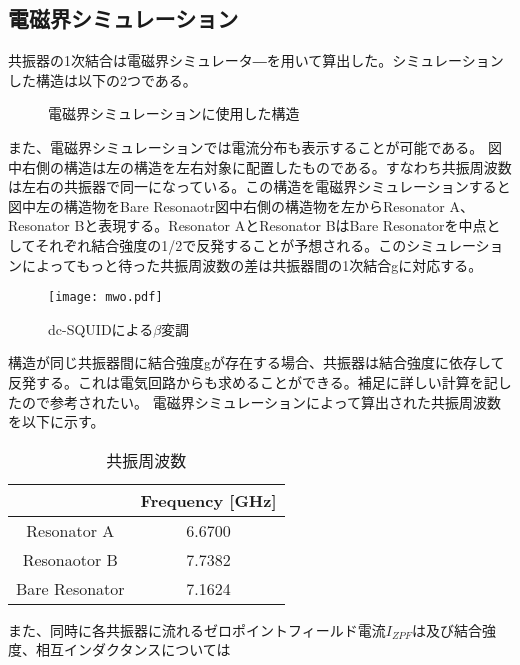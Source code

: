     \subsection{電磁界シミュレーション}
        共振器の1次結合は電磁界シミュレータ―を用いて算出した。シミュレーションした構造は以下の2つである。
        \begin{figure}[H]
            \caption{電磁界シミュレーションに使用した構造}
        \end{figure}
        また、電磁界シミュレーションでは電流分布も表示することが可能である。
        図中右側の構造は左の構造を左右対象に配置したものである。すなわち共振周波数は左右の共振器で同一になっている。この構造を電磁界シミュレーションすると図中左の構造物をBare Resonaotr図中右側の構造物を左からResonator A、Resonator Bと表現する。Resonator AとResonator BはBare Resonatorを中点としてそれぞれ結合強度の1/2で反発することが予想される。このシミュレーションによってもっと待った共振周波数の差は共振器間の1次結合gに対応する。
        \begin{figure}[H]
            \centering
            \texttt{[image: mwo.pdf]}
            \caption{dc-SQUIDによる$\beta$変調}
        \end{figure}
        構造が同じ共振器間に結合強度gが存在する場合、共振器は結合強度に依存して反発する。これは電気回路からも求めることができる。補足に詳しい計算を記したので参考されたい。
        電磁界シミュレーションによって算出された共振周波数を以下に示す。
        \begin{table}[h]
            \caption{共振周波数}
            \centering
            \begin{tabular}{@{}cc@{}}
            \toprule
                           & Frequency [GHz] \\ 
                           \hline \hline
            Resonator A    & 6.6700          \\
            Resonaotor B   & 7.7382          \\
            Bare Resonator & 7.1624          \\ \bottomrule
            \end{tabular}
            \end{table}
        また、同時に各共振器に流れるゼロポイントフィールド電流$I_{ZPF}$は及び結合強度、相互インダクタンスについては

